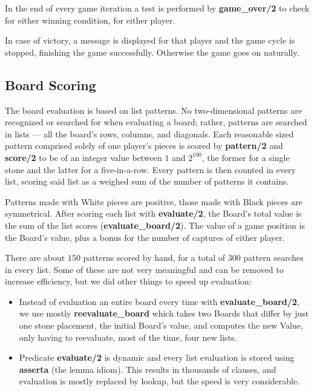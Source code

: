 \documentclass[12pt,a4paper,notitlepage]{article}
\begin{document}
In the end of every game iteration a test is performed by \textbf{game\_over/2} to check for either winning condition, for either player.

In case of victory, a message is displayed for that player and the game cycle is stopped, finishing the game successfully. Otherwise the game goes on naturally.

\subsection{Board Scoring}
\label{subsec:boardscoring}

The board evaluation is based on list patterns. No two-dimensional patterns are recognized or searched for when evaluating a board; rather, patterns are searched in lists --- all the board's rows, columns, and diagonals. Each reasonable sized pattern comprised solely of one player's pieces is scored by \textbf{pattern/2} and \textbf{score/2} to be of an integer value between $1$ and $2^{100}$, the former for a single stone and the latter for a five-in-a-row. Every pattern is then counted in every list, scoring said list as a weighed sum of the number of patterns it contains.

Patterns made with White pieces are positive, those made with Black pieces are symmetrical. After scoring each list with \textbf{evaluate/2}, the Board's total value is the sum of the list scores (\textbf{evaluate\_board/2}). The value of a game position is the Board's value, plus a bonus for the number of captures of either player.

There are about $150$ patterns scored by hand, for a total of $300$ pattern searches in every list. Some of these are not very meaningful and can be removed to increase efficiency, but we did other things to speed up evaluation:

\begin{itemize}
	\item Instead of evaluation an entire board every time with \textbf{evaluate\_board/2}, we use mostly \textbf{reevaluate\_board} which takes two Boards that differ by just one stone placement, the initial Board's value, and computes the new Value, only having to reevaluate, most of the time, four new lists.
	\item Predicate \textbf{evaluate/2} is dynamic and every list evaluation
	is stored using \textbf{asserta} (the lemma idiom). This results in thousands of clauses, and evaluation is mostly replaced by lookup, but the speed is very considerable.
\end{itemize}
\end{document}
